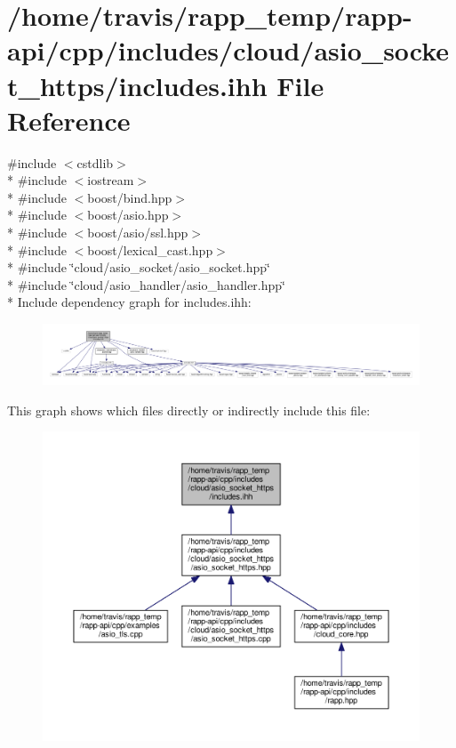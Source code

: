 \hypertarget{cloud_2asio__socket__https_2includes_8ihh}{\section{/home/travis/rapp\-\_\-temp/rapp-\/api/cpp/includes/cloud/asio\-\_\-socket\-\_\-https/includes.ihh File Reference}
\label{cloud_2asio__socket__https_2includes_8ihh}
}
{\ttfamily \#include $<$cstdlib$>$}\\*
{\ttfamily \#include $<$iostream$>$}\\*
{\ttfamily \#include $<$boost/bind.\-hpp$>$}\\*
{\ttfamily \#include $<$boost/asio.\-hpp$>$}\\*
{\ttfamily \#include $<$boost/asio/ssl.\-hpp$>$}\\*
{\ttfamily \#include $<$boost/lexical\-\_\-cast.\-hpp$>$}\\*
{\ttfamily \#include \char`\"{}cloud/asio\-\_\-socket/asio\-\_\-socket.\-hpp\char`\"{}}\\*
{\ttfamily \#include \char`\"{}cloud/asio\-\_\-handler/asio\-\_\-handler.\-hpp\char`\"{}}\\*
Include dependency graph for includes.\-ihh\-:
\nopagebreak
\begin{figure}[H]
\begin{center}
\leavevmode
\includegraphics[width=350pt]{cloud_2asio__socket__https_2includes_8ihh__incl}
\end{center}
\end{figure}
This graph shows which files directly or indirectly include this file\-:
\nopagebreak
\begin{figure}[H]
\begin{center}
\leavevmode
\includegraphics[width=350pt]{cloud_2asio__socket__https_2includes_8ihh__dep__incl}
\end{center}
\end{figure}
